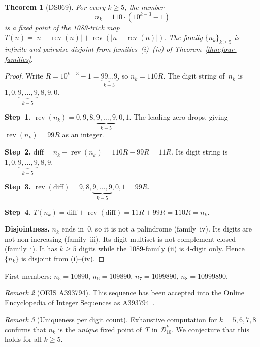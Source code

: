 \documentclass[11pt,a4paper]{amsart}
\theoremstyle{plain}
\newtheorem{theorem}{Theorem}
\theoremstyle{definition}
\theoremstyle{remark}
\newtheorem{remark}[theorem]{Remark}
\DeclareMathOperator{\rev}{rev}
\begin{document}
\begin{theorem}[DS069]\label{thm:fifth-family}
For every $k \geq 5$, the number
\[
n_k = 110 \cdot (10^{k-3} - 1)
\]
is a fixed point of the 1089-trick map
$T(n) = |n - \rev(n)| + \rev(|n - \rev(n)|)$.
The family $\{n_k\}_{k \geq 5}$ is infinite and pairwise disjoint from
families~(i)--(iv) of Theorem~\ref{thm:four-families}.
\end{theorem}

\begin{proof}
Write $R = 10^{k-3} - 1 = \underbrace{99\ldots9}_{k-3}$, so
$n_k = 110R$. The digit string of~$n_k$ is
$1, 0, \underbrace{9, \ldots, 9}_{k-5}, 8, 9, 0$.

\textbf{Step~1.} $\rev(n_k) = 0, 9, 8, \underbrace{9,\ldots,9}_{k-5}, 0, 1$.
The leading zero drops, giving $\rev(n_k) = 99R$ as an integer.

\textbf{Step~2.} $\text{diff} = n_k - \rev(n_k) = 110R - 99R = 11R$.
Its digit string is $1, 0, \underbrace{9, \ldots, 9}_{k-5}, 8, 9$.

\textbf{Step~3.} $\rev(\text{diff}) = 9, 8, \underbrace{9,\ldots,9}_{k-5}, 0, 1
= 99R$.

\textbf{Step~4.}
$T(n_k) = \text{diff} + \rev(\text{diff}) = 11R + 99R = 110R = n_k$.

\textbf{Disjointness.} $n_k$ ends in~0, so it is not a palindrome (family~iv).
Its digits are not non-increasing (family~iii). Its digit multiset is not
complement-closed (family~i). It has $k \geq 5$ digits while the 1089-family
(ii) is 4-digit only. Hence $\{n_k\}$ is disjoint from (i)--(iv).
\end{proof}

First members: $n_5 = 10890$, $n_6 = 109890$, $n_7 = 1099890$,
$n_8 = 10999890$.

\begin{remark}[OEIS A393794]\label{rem:oeis-a393794}
This sequence has been accepted into the Online Encyclopedia of Integer
Sequences as A393794~\cite{OEIS-A393794}.
\end{remark}

\begin{remark}[Uniqueness per digit count]\label{rem:truc-unique}
Exhaustive computation for $k = 5, 6, 7, 8$ confirms that $n_k$ is the
\emph{unique} fixed point of~$T$ in $\mathcal{D}_{10}^k$. We conjecture
that this holds for all $k \geq 5$.
\end{remark}
\end{document}
